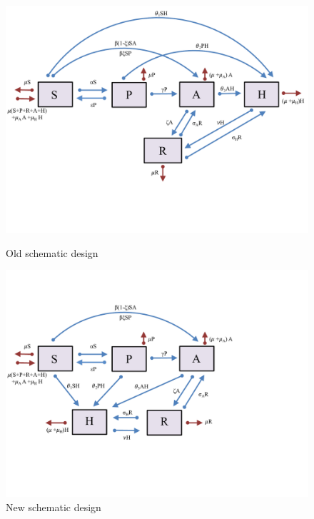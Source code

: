\documentclass[12pt]{article}
\begin{document}
\begin{figure}[!htb]


\hspace{-.7cm}
\includegraphics[width=1.1\linewidth, height=0.4\textheight]{heroin_schematic_without_delta_old_design}
\caption{Old schematic design}



\vspace{2cm}
\hspace{.8cm}
\includegraphics[width=0.9\linewidth, height=0.3\textheight]{heroin_schematic_without_delta_new_design}
\caption{New schematic design}

\end{figure}


\newpage
\end{document}
